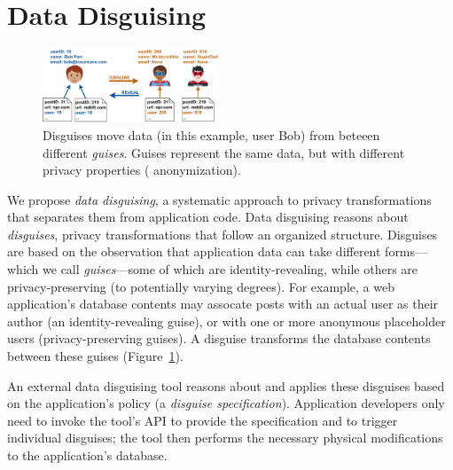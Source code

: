 \section{Data Disguising}
\begin{figure}[t]
    \centering
    \includegraphics[width=0.47\textwidth]{img/disguises_new}

    \caption{Disguises move data (in this example, user Bob) from
             beteeen different \emph{guises}. Guises represent the
             same data, but with different privacy properties (\eg
             anonymization).}
    \label{fig:example}
\end{figure}

%
We propose \emph{data disguising}, a systematic approach to privacy
transformations that separates them from application code.
%
Data disguising reasons about \emph{disguises}, privacy transformations that
follow an organized structure.
%
Disguises are based on the observation that application data can take
different forms---which we call \emph{guises}---some of which are
identity-revealing, while others are privacy-preserving (to potentially
varying degrees).
%
For example, a web application's database contents may assocate posts with
an actual user as their author (an identity-revealing guise), or with
one or more anonymous placeholder users (privacy-preserving guises).
%
A disguise transforms the database contents between these guises
(Figure~\ref{fig:example}).
%
%
%
%

%
An external data disguising tool reasons about and applies these disguises
based on the application's policy (a \emph{disguise specification}).
%
Application developers only need to invoke the tool's API to provide the
specification and to trigger individual disguises; the tool then performs the
necessary physical modifications to the application's database.
%


